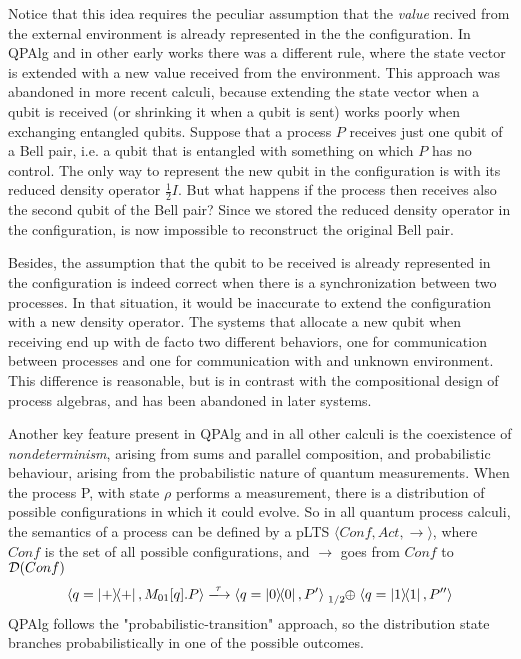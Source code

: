 Notice that this idea requires the peculiar assumption that the \textit{value} recived from the external environment is already represented in the the configuration. In QPAlg and in other early works \cite{fengProbabilisticBisimulationsQuantum2007} there was a different rule, where the state vector is extended with a new value received from the environment. This approach was abandoned in more recent calculi, because extending the state vector when a qubit is received (or shrinking it when a qubit is sent) works poorly when exchanging entangled qubits. 
Suppose that a process $P$ receives just one qubit of a Bell pair, i.e. a qubit that is entangled with something on which $P$ has no control. The only way to represent the new qubit in the configuration is with its reduced density operator $\frac{1}{2}I$. But what happens if the process then receives also the second qubit of the Bell pair? Since we stored the reduced density operator in the configuration, is now impossible to reconstruct the original Bell pair.

Besides, the assumption that the qubit to be received is already represented in the configuration is indeed correct when there is a synchronization between two processes. In that situation, it would be inaccurate to extend the configuration with a new density operator. The systems that allocate a new qubit when receiving end up with de facto two different behaviors, one for communication between processes and one for communication with and unknown environment. This difference is reasonable, but is in contrast with the compositional design of process algebras, and has been abandoned in later systems.


Another key feature present in QPAlg and in all other calculi is the coexistence of \textit{nondeterminism}, arising from sums and parallel composition, and probabilistic behaviour, arising from the probabilistic nature of quantum measurements. When the process P, with state $\rho$ performs a measurement, there is a distribution of possible configurations in which it could evolve. So in all quantum process calculi, the semantics of a process can be defined by a pLTS $\langle Conf, Act, \rightarrow \rangle$, where $Conf$ is the set of all possible configurations, and $\rightarrow$ goes from $Conf$ to $\mathcal{D}(Conf)$
\[
	\confw{q = \proj{+}, M_{01}[q].P} 
	\xlongrightarrow{\tau} 
	\confw{q = \proj{0}, P'} \psum{1/2} \confw{q = \proj{1}, P''}
\]
QPAlg follows the "probabilistic-transition" approach, so the distribution state branches probabilistically in one of the possible outcomes.



